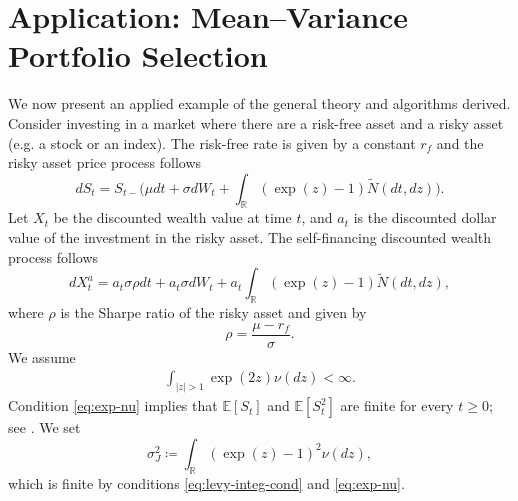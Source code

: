 \documentclass[11pt]{article}
\newcommand{\1}{\mathbbm{1}}
\begin{document}
\section{Application: Mean--Variance Portfolio Selection}\label{sec:mean-var}
We now present an applied example of the general theory and algorithms derived. Consider investing in a market where there are a risk-free asset and a risky asset (e.g. a stock or an index). The risk-free rate is given by a constant $r_f$ and the risky asset price process follows
\begin{equation}
	dS_t=S_{t-}\bigg(\mu dt+ \sigma dW_t + \int_{\mathbb{R}} (\exp(z)-1) \widetilde{N}(dt, dz)\bigg).\label{eq:stock-SDE}
\end{equation}
Let $X_t$ be the discounted wealth value at time $t$, and $a_t$ is the discounted dollar value of the investment in the risky asset. The self-financing discounted wealth process follows
\begin{equation}\label{eq:wealth-det}
	dX^{a}_t = a_t\sigma\rho dt + a_t\sigma dW_t + a_t \int_{\mathbb{R}} (\exp(z)-1)\widetilde{N}(dt, dz),
\end{equation}
where $\rho$ is the Sharpe ratio of the risky asset and given by
\begin{equation}\label{eq:rho}
\rho=\frac{\mu-r_f}{\sigma}.
\end{equation}
We assume
\begin{align}
	\int_{|z|>1}\exp(2z)\nu(dz)<\infty. \label{eq:exp-nu}
\end{align}
Condition \eqref{eq:exp-nu} implies that $\mathbb{E}[S_t]$ and $\mathbb{E}[S_t^2]$ are finite for every $t\geq 0$; see \cite[Proposition 3.14]{tankov2004financial}. We set
\begin{equation}
\sigma_J^2\coloneqq\int_{\mathbb{R}} (\exp(z)-1)^2\nu(dz),\label{eq:sigma-J}	
\end{equation}
which is finite by conditions \eqref{eq:levy-integ-cond} and \eqref{eq:exp-nu}.
\end{document}

